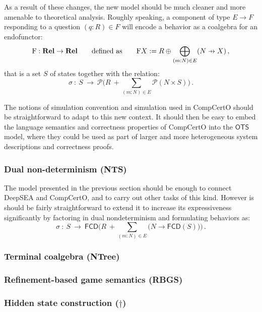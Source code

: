 \documentclass{article}
\newcommand\pfun{\mathrel{\ooalign{\hfil$\mapstochar\mkern5mu$\hfil\cr$\to$\cr}}}
\begin{document}
As a result of these changes,
the new model should be much cleaner and
more amenable to theoretical analysis.
Roughly speaking,
a component of type $E \rightarrow F$
responding to a question $(q \mathbin: R) \in F$
will encode a behavior
as a coalgebra for an endofunctor:
\[
  \mathrm{F} : \mathbf{Rel} \rightarrow \mathbf{Rel}
  \qquad \text{defined as} \qquad
  \mathrm{F} X := R \oplus \bigoplus_{(m \mathbin: N) \in E} (N \pfun X)
  \,,
\]
that is a set $S$ of states together with the relation:
\[
  \sigma \: : \: S \: \rightarrow \: \mathcal{P}
    \Big( R \: + \sum_{(m \mathbin: N) \in E} \mathcal{P}(N \times S) \Big)
  \,.
\]

The notions of simulation convention and simulation
used in CompCertO
should be straightforward to adapt
to this new context.
It should then be easy to embed
the language semantics and correctness properties of CompCertO
into the $\mathsf{OTS}$ model,
where they could be used as part of
larger and more heterogeneous
system descriptions and correctness proofs.


\subsubsection{Dual non-determinism (NTS)}

The model presented in the previous section
should be enough to connect DeepSEA and CompCertO,
and to carry out other tasks of this kind.
However is should be fairly straightforward to extend it
to increase its expressiveness significantly
by factoring in dual nondeterminism
and formulating behaviors as:
\[
  \sigma \: : \: S \: \rightarrow \: \mathsf{FCD}
    \Big( R \: + \sum_{(m \mathbin: N) \in E}
        \big( N \rightarrow \mathsf{FCD}(S) \big) \Big)
  \,.
\]

\subsubsection{Terminal coalgebra (NTree)}

\subsubsection{Refinement-based game semantics (RBGS)}

\subsubsection{Hidden state construction ($\dagger$)}
\end{document}
